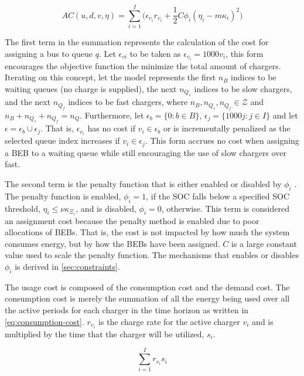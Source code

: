 \documentclass[11pt,a4paper,final]{article}
\newcommand{\AC}{AC(u, d, v, \eta)}         %
\newcommand{\Iset}{I}                       %
\newcommand{\Bset}{B}                       %
\begin{document}
\begin{equation}
\label{eq:ac}
\AC = \sum_{i=1}^I \Big(\epsilon_{v_i}r_{v_i} + \frac{1}{2} C \phi_i (\eta_i - m \kappa_i)^{2}\Big)
\end{equation}

The first term in the summation represents the calculation of the cost for assigning a bus to queue \(q\). Let \(\epsilon_{vi}\) to
be taken as \(\epsilon_{v_i} = 1000v_i\), this form encourages the objective function the minimize the total amount of chargers.
Iterating on this concept, let the model represents the first \(n_B\) indices to be waiting queues (no charge is
supplied), the next \(n_{Q_s}\) indices to be slow chargers, and the next \(n_{Q_f}\) indices to be fast chargers, where
\(n_B, n_{Q_s}, n_{Q_f} \in \mathcal{Z}\) and \(n_B + n_{Q_s} + n_{Q_f} = n_Q\). Furthermore, let \(\epsilon_b = \{ 0 : b \in \Bset \}\), \(\epsilon_{j} =
\{ 1000 j: j \in \Iset \}\) and let \(\epsilon = \epsilon_b \cup \epsilon_j\). That is, \(\epsilon_{v_i}\) has no cost if \(v_i \in \epsilon_b\) or is incrementally
penalized as the selected queue index increases if \(v_i \in \epsilon_j\). This form accrues no cost when assigning a BEB to a
waiting queue while still encouraging the use of slow chargers over fast.

The second term is the penalty function that is either enabled or disabled by \(\phi_i\)
\cite{luenberger-2008-penal-barrier-method}. The penalty function is enabled, \(\phi_i = 1\), if the SOC falls below a
specified SOC threshold, \(\eta_i \le \nu \kappa_{\Xi_i}\), and is disabled, \(\phi_i = 0\), otherwise. This term is considered an assignment
cost because the penalty method is enabled due to poor allocations of BEBs. That is, the cost is not impacted by how
much the system consumes energy, but by how the BEBs have been assigned. \(C\) is a large constant value used to scale the
penalty function. The mechanisms that enables or disables \(\phi_i\) is derived in \ref{sec:constraints}.

The usage cost is composed of the consumption cost and the demand cost. The consumption cost is merely the summation of
all the energy being used over all the active periods for each charger in the time horizon as written in
\ref{eq:consumption-cost}. \(r_{v_i}\) is the charge rate for the active charger \(v_i\) and is multiplied by the time that the
charger will be utilized, \(s_i\).

\begin{equation}
\label{eq:consumption-cost}
  \sum_{i=1}^I r_{v_i}s_i
\end{equation}
\end{document}
